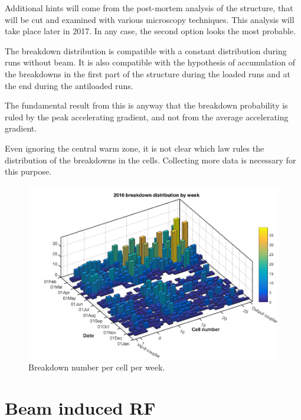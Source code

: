 Additional hints will come from the post-mortem analysis of the structure, that will be cut and examined with various microscopy techniques. This analysis will take place later in 2017. In any case, the second option looks the most probable. 

The breakdown distribution is compatible with a constant distribution during runs without beam. It is also compatible with the hypothesis of accumulation of the breakdowns in  the first part of the structure during the loaded runs and at the end during the antiloaded runs.

The fundamental result from this is anyway that the breakdown probability is ruled by the peak accelerating gradient, and not from the average accelerating gradient.


Even ignoring the central warm zone, it is not clear which law rules the distribution of the breakdowns in the cells. Collecting more data is necessary for this purpose.

\begin{figure}[h]
\centering 
\includegraphics[scale=0.4]{pictures/week_distr_3D.png}
\caption{Breakdown number per cell per week. }
\label{BD_3d}
\end{figure}









\section[Beam induced RF]{Beam induced RF}

